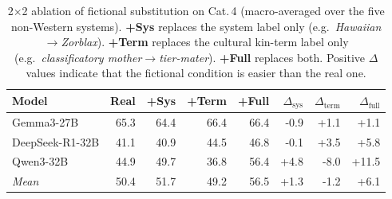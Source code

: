 \begin{table}[t]
\centering
\small
\begin{tabular}{lrrrrrrr}
\toprule
Model & Real & +Sys & +Term & +Full & $\Delta_{\text{sys}}$ & $\Delta_{\text{term}}$ & $\Delta_{\text{full}}$\\
\midrule
Gemma3-27B & 65.3 & 64.4 & 66.4 & 66.4 & -0.9 & +1.1 & +1.1\\
DeepSeek-R1-32B & 41.1 & 40.9 & 44.5 & 46.8 & -0.1 & +3.5 & +5.8\\
Qwen3-32B & 44.9 & 49.7 & 36.8 & 56.4 & +4.8 & -8.0 & +11.5\\
\midrule
\textit{Mean} & 50.4 & 51.7 & 49.2 & 56.5 & +1.3 & -1.2 & +6.1\\
\bottomrule
\end{tabular}
\caption{2$\times$2 ablation of fictional substitution on Cat.\,4 (macro-averaged over the five non-Western systems). \textbf{+Sys} replaces the system label only (e.g.\ \emph{Hawaiian}$\to$\emph{Zorblax}). \textbf{+Term} replaces the cultural kin-term label only (e.g.\ \emph{classificatory mother}$\to$\emph{tier-mater}). \textbf{+Full} replaces both. Positive $\Delta$ values indicate that the fictional condition is easier than the real one.}
\label{tab:fictional-2x2}
\end{table}
